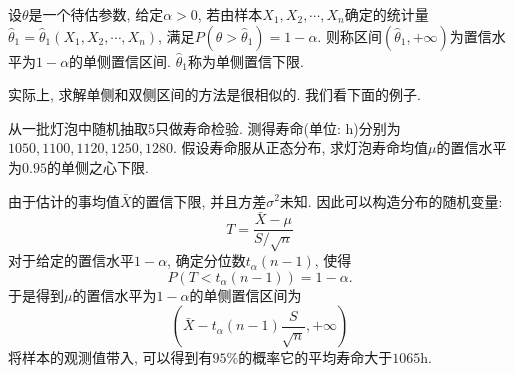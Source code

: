 \begin{definition}
    设$\theta$是一个待估参数, 给定$\alpha>0$, 若由样本$X_1, X_2, \cdots, X_n$确定的统计量$\hat\theta_1=\hat\theta_1(X_1, X_2, \cdots, X_n)$, 满足$P(\theta>\hat\theta_1)=1-\alpha.$ 则称区间$(\hat\theta_1,+\infty)$为置信水平为$1-\alpha$的单侧置信区间. $\hat\theta_1$称为单侧置信下限. 
\end{definition}

实际上, 求解单侧和双侧区间的方法是很相似的. 我们看下面的例子. 

\begin{example}
    从一批灯泡中随机抽取5只做寿命检验. 测得寿命(单位: h)分别为$1050, 1100, 1120, 1250, 1280$. 假设寿命服从正态分布, 求灯泡寿命均值$\mu$的置信水平为$0.95$的单侧之心下限. 
\end{example}

\begin{solution}
    由于估计的事均值$\bar X$的置信下限, 并且方差$\sigma^2$未知. 因此可以构造分布的随机变量: 
    \[
        T=\frac{\bar X - \mu}{S/\sqrt n}    
    \]
    对于给定的置信水平$1-\alpha$, 确定分位数$t_{\alpha}(n-1)$, 使得
    \[
        P\left(
            T<t_{\alpha}(n-1)
        \right)=1-\alpha.
    \]
    于是得到$\mu$的置信水平为$1-\alpha$的单侧置信区间为
    \[
        \left(
            \bar X - t_\alpha (n-1) \frac S {\sqrt n} , +\infty
        \right)
    \]
    将样本的观测值带入, 可以得到有$95\%$的概率它的平均寿命大于$1065$h. 
\end{solution}

